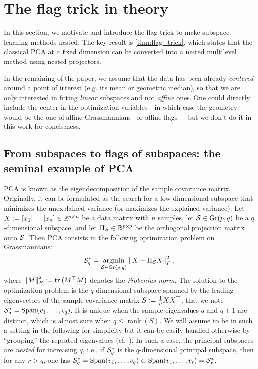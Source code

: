  \section{The flag trick in theory}\label{sec:flag_trick}
In this section, we motivate and introduce the flag trick to make subspace learning methods nested.
The key result is \autoref{thm:flag_trick}, which states that the classical PCA at a fixed dimension can be converted into a nested multilevel method using nested projectors.

In the remaining of the paper, we assume that the data has been already \textit{centered} around a point of interest (e.g. its mean or geometric median), so that we are only interested in fitting \textit{linear} subspaces and not \textit{affine} ones. 
One could directly include the center in the optimization variables---in which case the geometry would be the one of affine Grassmannians~\citep{lim_numerical_2019} or affine flags~\citep{pennec_barycentric_2018}---but we don't do it in this work for conciseness.


\subsection{From subspaces to flags of subspaces: the seminal example of PCA}
PCA is known as the eigendecomposition of the sample covariance matrix. Originally, it can be formulated as the search for a low dimensional subspace that minimizes the unexplained variance (or maximizes the explained variance).
Let $X:=[x_1|\dots|x_n] \in \R^{p\times n}$ be a data matrix with $n$ samples, let $\S \in \Gr(p, q)$ be a $q$-dimensional subspace, and let $\Pi_{\S} \in \R^{p\times p}$ be the orthogonal projection matrix onto $\S$.
Then PCA consists in the following optimization problem on Grassmannians:
\begin{equation}\label{eq:PCA_subspace}
\S_q^* = \argmin{\S \in \Gr(p, q)} \norm{X - \Pi_{\S} X}_F^2,
\end{equation}
where $\norm{M}_F^2 := \tr{M\T M}$ denotes the \textit{Frobenius norm}.
The solution to the optimization problem is the $q$-dimensional subspace spanned by the leading eigenvectors of the sample covariance matrix $S := \frac 1 n X X\T$, that we note $\S_q^* = \operatorname{Span}(v_1, \dots, v_q)$. 
It is unique when the sample eigenvalues $q$ and $q+1$ are distinct, which is almost sure when $q \leq \operatorname{rank}(S)$. We will assume to be in such a setting in the following for simplicity but it can be easily handled otherwise by ``grouping'' the repeated eigenvalues (cf.~\citet[Theorem~B.1]{szwagier_curse_2024}).
In such a case, the principal subspaces are \textit{nested} for increasing $q$, i.e., if $\S_q^*$ is the $q$-dimensional principal subspace, then for any $r > q$, one has $\S_q^* = \operatorname{Span}(v_1, \dots, v_q) \subset \operatorname{Span}(v_1, \dots, v_r) = \S_r^*$.

